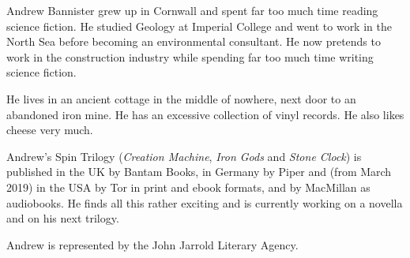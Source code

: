 Andrew Bannister grew up in Cornwall and spent far too much time reading science fiction. He studied Geology at Imperial College and went to work in the North Sea before becoming an environmental consultant. He now pretends to work in the construction industry while spending far too much time writing science fiction.

He lives in an ancient cottage in the middle of nowhere, next door to an abandoned iron mine. He has an excessive collection of vinyl records. He also likes cheese very much.

Andrew's Spin Trilogy (\emph{Creation Machine}, \emph{Iron Gods} and \emph{Stone Clock}) is published in the UK by Bantam Books, in Germany by Piper and (from March 2019) in the USA by Tor in print and ebook formats, and by MacMillan as audiobooks. He finds all this rather exciting and is currently working on a novella and on his next trilogy.

Andrew is represented by the John Jarrold Literary Agency.
